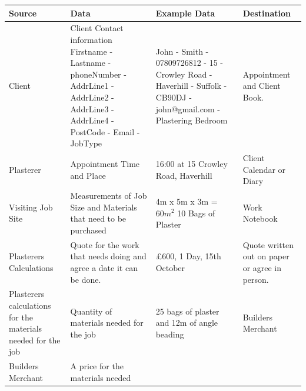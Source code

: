 \begin{center}
	
    \begin{tabular}{|p{3cm}|p{3cm}|p{3cm}|p{3cm}|}
		\hline
		\textbf{Source} & \textbf{Data} & \textbf{Example Data} & 			 \textbf{Destination} \\

 \hline

        Client  &

			{Client Contact information Firstname - Lastname -  phoneNumber - AddrLine1 - 
AddrLine2 - AddrLine3 - AddrLine4 - PostCode - Email - JobType} & 

John - Smith - 07809726812 - 15 -  Crowley Road - Haverhill - Suffolk - CB90DJ - john@gmail.com - Plastering Bedroom &

Appointment and Client Book.
			
        \\
\hline

Plasterer &

Appointment Time and Place &

16:00 at 15 Crowley Road, Haverhill &

Client Calendar or Diary 

\\
\hline
Visiting Job Site &

Measurements of Job Size and Materials that need to be purchased &

4m x 5m x 3m = $60m^2$ 10 Bags of Plaster &

Work Notebook 

\\
\hline
Plasterers Calculations &

Quote for the work that needs doing and agree a date it can be done. &

\pounds 600, 1 Day, 15th October & 

Quote written out on paper or agree in person.

\\
\hline

Plasterers calculations for the materials needed for the job &

Quantity of materials needed for the job &

25 bags of plaster and 12m of angle beading &

Builders Merchant

\\
\hline
Builders Merchant &

A price for the materials needed &


\end{tabular}
\end{center}

